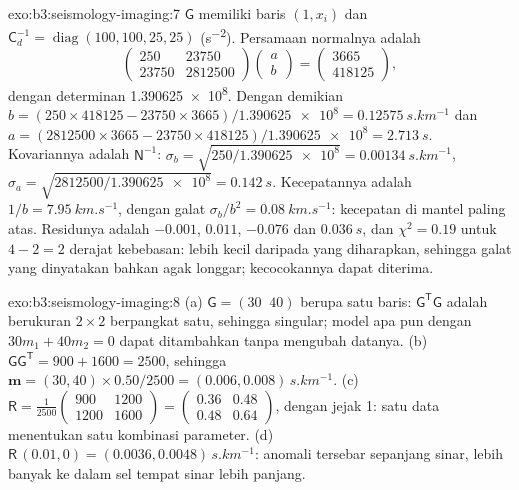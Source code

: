 \begin{solution}{exo:b3:seismology-imaging:7}
$\mathsf G$ memiliki baris $(1, x_i)$ dan $\mathsf C_d^{-1} = \operatorname{diag}
(100, 100, 25, 25)$ (\unit{s^{-2}}). Persamaan normalnya adalah
\[
  \begin{pmatrix} 250 & 23750 \\ 23750 & \num{2812500} \end{pmatrix}
  \begin{pmatrix} a \\ b \end{pmatrix}
  = \begin{pmatrix} 3665 \\ 418125 \end{pmatrix},
\]
dengan determinan \num{1.390625e8}. Dengan demikian $b = (250\times418125 -
23750\times3665)/\num{1.390625e8} = \qty{0.12575}{s.km^{-1}}$ dan
$a = (2812500\times3665 - 23750\times418125)/\num{1.390625e8} =
\qty{2.713}{s}$. Kovariannya adalah $\mathsf N^{-1}$: $\sigma_b =
\sqrt{250/\num{1.390625e8}} = \qty{0.00134}{s.km^{-1}}$, $\sigma_a =
\sqrt{2812500/\num{1.390625e8}} = \qty{0.142}{s}$. Kecepatannya adalah
$1/b = \qty{7.95}{km.s^{-1}}$, dengan galat $\sigma_b/b^2 =
\qty{0.08}{km.s^{-1}}$: kecepatan di mantel paling atas. Residunya adalah $-0.001$,
$0.011$, $-0.076$ dan $\qty{0.036}{s}$, dan $\chi^2 = 0.19$ untuk $4 - 2 = 2$
derajat kebebasan: lebih kecil daripada yang diharapkan, sehingga galat yang dinyatakan
bahkan agak longgar; kecocokannya dapat diterima.
\end{solution}

\begin{solution}{exo:b3:seismology-imaging:8}
(a) $\mathsf G = (30\;\;40)$ berupa satu baris: $\mathsf G^{\mathsf T}\mathsf G$ adalah
berukuran $2\times2$ berpangkat satu, sehingga singular; model apa pun dengan $30m_1 + 40m_2 = 0$ dapat
ditambahkan tanpa mengubah datanya. (b) $\mathsf G\mathsf G^{\mathsf T} =
900 + 1600 = 2500$, sehingga $\mathbf m = (30, 40)\times0.50/2500 =
(0.006, 0.008)\,\unit{s.km^{-1}}$. (c) $\mathsf R = \frac{1}{2500}
\begin{pmatrix} 900 & 1200 \\ 1200 & 1600 \end{pmatrix} =
\begin{pmatrix} 0.36 & 0.48 \\ 0.48 & 0.64 \end{pmatrix}$, dengan jejak 1: satu
data menentukan satu kombinasi parameter. (d) $\mathsf R\,(0.01, 0) =
(0.0036, 0.0048)\,\unit{s.km^{-1}}$: anomali tersebar sepanjang sinar, lebih
banyak ke dalam sel tempat sinar lebih panjang.
\end{solution}

